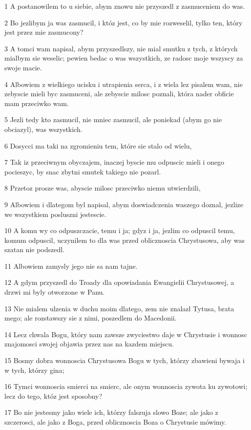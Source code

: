 \par 1 A postanowilem to u siebie, abym znowu nie przyszedl z zasmuceniem do was.
\par 2 Bo jezlibym ja was zasmucil, i któz jest, co by mie rozweselil, tylko ten, który jest przez mie zasmucony?
\par 3 A tomci wam napisal, abym przyszedlszy, nie mial smutku z tych, z których mialbym sie weselic; pewien bedac o was wszystkich, ze radosc moje wszyscy za swoje macie.
\par 4 Albowiem z wielkiego ucisku i utrapienia serca, i z wiela lez pisalem wam, nie zebyscie mieli byc zasmuceni, ale zebyscie milosc poznali, która nader obficie mam przeciwko wam.
\par 5 Jezli tedy kto zasmucil, nie mniec zasmucil, ale poniekad (abym go nie obciazyl), was wszystkich.
\par 6 Dosycci ma taki na zgromieniu tem, które sie stalo od wielu,
\par 7 Tak iz przeciwnym obyczajem, inaczej byscie mu odpuscic mieli i onego pocieszyc, by snac zbytni smutek takiego nie pozarl.
\par 8 Przetoz prosze was, abyscie milosc przeciwko niemu utwierdzili,
\par 9 Albowiem i dlategom byl napisal, abym doswiadczenia waszego doznal, jezlize we wszystkiem posluszni jestescie.
\par 10 A komu wy co odpuszczacie, temu i ja; gdyz i ja, jezlim co odpuscil temu, komum odpuscil, uczynilem to dla was przed oblicznoscia Chrystusowa, aby was szatan nie podszedl.
\par 11 Albowiem zamysly jego nie sa nam tajne.
\par 12 A gdym przyszedl do Troady dla opowiadania Ewangielii Chrystusowej, a drzwi mi byly otworzone w Panu.
\par 13 Nie mialem ulzenia w duchu moim dlatego, zem nie znalazl Tytusa, brata mego; ale rozstawszy sie z nimi, poszedlem do Macedonii.
\par 14 Lecz chwala Bogu, który nam zawsze zwyciestwo daje w Chrystusie i wonnosc znajomosci swojej objawia przez nas na kazdem miejscu.
\par 15 Bosmy dobra wonnoscia Chrystusowa Bogu w tych, którzy zbawieni bywaja i w tych, którzy gina;
\par 16 Tymci wonnoscia smierci na smierc, ale onym wonnoscia zywota ku zywotowi; lecz do tego, któz jest sposobny?
\par 17 Bo nie jestesmy jako wiele ich, którzy falszuja slowo Boze; ale jako z szczerosci, ale jako z Boga, przed oblicznoscia Boza o Chrystusie mówimy.

